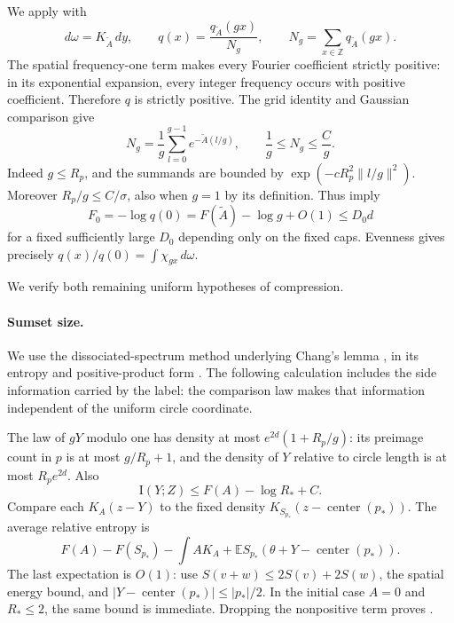 We apply  with
\[
 d\omega=K_{\widetilde A}\,dy,\qquad
 q(x)=\frac{q_{\widetilde A}(gx)}{N_g},\qquad
 N_g=\sum_{x\in\mathbb Z}q_{\widetilde A}(gx).
\]
The spatial frequency-one term makes every Fourier coefficient strictly
positive: in its exponential expansion, every integer frequency occurs
with positive coefficient.  Therefore $q$ is strictly positive.  The
grid identity and Gaussian comparison give
\begin{equation}\label{eq:thermal-grid-normalizer}
 N_g=\frac1g\sum_{l=0}^{g-1}e^{-\widetilde A(l/g)},\qquad
 \frac1g\le N_g\le\frac Cg.
\end{equation}
Indeed $g\le R_p$, and the summands are bounded by
$\exp(-cR_p^2\|l/g\|^2)$.  Moreover $R_p/g\le C/\sigma$, also when
$g=1$ by its definition.  Thus 
imply
\[
 F_0=-\log q(0)=F(\widetilde A)-\log g+O(1)\le D_0d
\]
for a fixed sufficiently large $D_0$ depending only on the fixed caps.
Evenness gives precisely
$q(x)/q(0)=\int\chi_{gx}\,d\omega$.

We verify both remaining uniform hypotheses of compression.

\paragraph{Sumset size.}
We use the dissociated-spectrum method underlying Chang's lemma
\cite[Section~3]{Chang2002}, in its entropy and positive-product form
\cite[Section~3.2]{Lee2017}. The following calculation includes the side
information carried by the label: the comparison law makes that
information independent of the uniform circle coordinate.

The law of $gY$ modulo one has density at most
$e^{2d}(1+R_p/g)$: its preimage count in $p$ is at most $g/R_p+1$,
and the density of $Y$ relative to circle length is at most $R_pe^{2d}$.
Also
\begin{equation}\label{eq:thermal-label-information}
 \mathrm I(Y;Z)\le F(A)-\log R_*+C.
\end{equation}
Compare each $K_A(z-Y)$ to the fixed density
$K_{S_{p_*}}(z-\operatorname{center}(p_*))$.  The average relative
entropy is
\[
 F(A)-F(S_{p_*})-\int AK_A
 +\mathbb E S_{p_*}(\theta+Y-\operatorname{center}(p_*)).
\]
The last expectation is $O(1)$: use
$S(v+w)\le2S(v)+2S(w)$, the spatial energy bound, and
$|Y-\operatorname{center}(p_*)|\le|p_*|/2$.  In the initial case $A=0$
and $R_*\le2$, the same bound is immediate.  Dropping the nonpositive
term proves .


